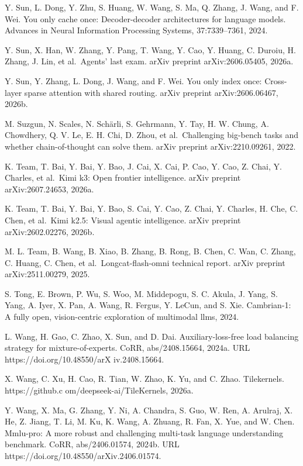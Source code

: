 Y. Sun, L. Dong, Y. Zhu, S. Huang, W. Wang, S. Ma, Q. Zhang, J. Wang,
and F. Wei. You only cache once: Decoder-decoder architectures for
language models. Advances in Neural Information Processing Systems,
37:7339--7361, 2024.



Y. Sun, X. Han, W. Zhang, Y. Pang, T. Wang, Y. Cao, Y. Huang, C. Duroiu,
H. Zhang, J. Lin, et al.~Agents' last exam. arXiv preprint
arXiv:2606.05405, 2026a.

Y. Sun, Y. Zhang, L. Dong, J. Wang, and F. Wei. You only index once:
Cross-layer sparse attention with shared routing. arXiv preprint
arXiv:2606.06467, 2026b.

M. Suzgun, N. Scales, N. Schärli, S. Gehrmann, Y. Tay, H. W. Chung, A.
Chowdhery, Q. V. Le, E. H. Chi, D. Zhou, et al.~Challenging big-bench
tasks and whether chain-of-thought can solve them. arXiv preprint
arXiv:2210.09261, 2022.

K. Team, T. Bai, Y. Bai, Y. Bao, J. Cai, X. Cai, P. Cao, Y. Cao, Z.
Chai, Y. Charles, et al.~Kimi k3: Open frontier intelligence. arXiv
preprint arXiv:2607.24653, 2026a.

K. Team, T. Bai, Y. Bai, Y. Bao, S. Cai, Y. Cao, Z. Chai, Y. Charles, H.
Che, C. Chen, et al.~Kimi k2.5: Visual agentic intelligence. arXiv
preprint arXiv:2602.02276, 2026b.

M. L. Team, B. Wang, B. Xiao, B. Zhang, B. Rong, B. Chen, C. Wan, C.
Zhang, C. Huang, C. Chen, et al.~Longcat-flash-omni technical report.
arXiv preprint arXiv:2511.00279, 2025.

S. Tong, E. Brown, P. Wu, S. Woo, M. Middepogu, S. C. Akula, J. Yang, S.
Yang, A. Iyer, X. Pan, A. Wang, R. Fergus, Y. LeCun, and S. Xie.
Cambrian-1: A fully open, vision-centric exploration of multimodal llms,
2024.

L. Wang, H. Gao, C. Zhao, X. Sun, and D. Dai. Auxiliary-loss-free load
balancing strategy for mixture-of-experts. CoRR, abs/2408.15664, 2024a.
URL https://doi.org/10.48550/arX iv.2408.15664.

X. Wang, C. Xu, H. Cao, R. Tian, W. Zhao, K. Yu, and C. Zhao.
Tilekernels. https://github.c om/deepseek-ai/TileKernels, 2026a.

Y. Wang, X. Ma, G. Zhang, Y. Ni, A. Chandra, S. Guo, W. Ren, A. Arulraj,
X. He, Z. Jiang, T. Li, M. Ku, K. Wang, A. Zhuang, R. Fan, X. Yue, and
W. Chen. Mmlu-pro: A more robust and challenging multi-task language
understanding benchmark. CoRR, abs/2406.01574, 2024b. URL
https://doi.org/10.48550/arXiv.2406.01574.

